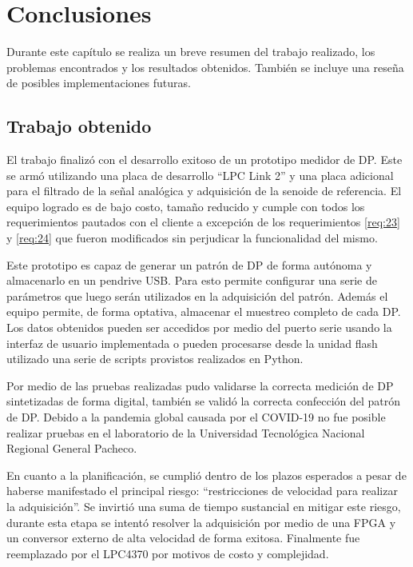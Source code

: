 
\chapter{Conclusiones} %

\label{Chapter5} %
Durante este capítulo se realiza un breve resumen del trabajo realizado, los problemas encontrados y los resultados obtenidos. También se incluye una reseña de posibles implementaciones futuras.\label{a:a}

\section{Trabajo obtenido}

El trabajo finalizó con el desarrollo exitoso de un prototipo medidor de DP. Este se armó utilizando una placa de desarrollo “LPC Link 2” y una placa adicional para el filtrado de la señal analógica y adquisición de la senoide de referencia. El equipo logrado es de bajo costo, tamaño reducido y cumple con todos los requerimientos pautados con el cliente a excepción de los requerimientos \ref{req:23} y \ref{req:24} que fueron modificados sin perjudicar la funcionalidad del mismo.

Este prototipo es capaz de generar un patrón de DP de forma autónoma y almacenarlo en un pendrive USB. Para esto permite configurar una serie de parámetros que luego serán utilizados en la adquisición del patrón. Además el equipo permite, de forma optativa, almacenar el muestreo completo de cada DP. Los datos obtenidos pueden ser accedidos por medio del puerto serie usando la interfaz de usuario implementada o pueden procesarse desde la unidad flash utilizado una serie de scripts provistos realizados en Python.

Por medio de las pruebas realizadas pudo validarse la correcta medición de DP sintetizadas de forma digital, también se validó la correcta confección del patrón de DP. Debido a la pandemia global causada por el COVID-19 no fue posible realizar pruebas en el laboratorio de la Universidad Tecnológica Nacional Regional General Pacheco.

En cuanto a la planificación, se cumplió dentro de los plazos esperados a pesar de haberse manifestado el principal riesgo: “restricciones de velocidad para realizar la adquisición”. Se invirtió una suma de tiempo sustancial en mitigar este riesgo, durante esta etapa se intentó resolver la adquisición por medio de una FPGA y un conversor externo de alta velocidad de forma exitosa. Finalmente fue reemplazado por el LPC4370 por motivos de costo y complejidad.

